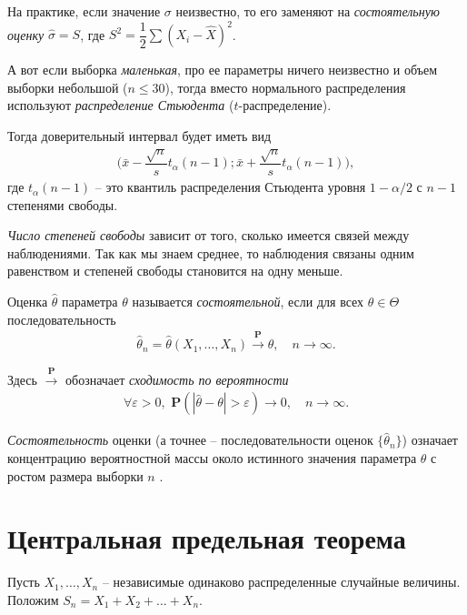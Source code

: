 \documentclass[%
	11pt,
	a4paper,
	utf8,
		]{article}
\begin{document}
На практике, если значение $ \sigma $ неизвестно, то его заменяют на \emph{состоятельную оценку} $ \hat{\sigma} = S $, где $ S^2 = \dfrac{1}{2}\sum (X_i - \hat{X})^2 $.

А вот если выборка \emph{маленькая}, про ее параметры ничего неизвестно и объем выборки небольшой ($ n \leqslant 30 $), тогда вместо нормального распределения используют \emph{распределение Стьюдента} ($ t $-распределение).

Тогда доверительный интервал будет иметь вид
\begin{align*}
	\Big( \bar{x} - \dfrac{\sqrt{n}}{s} t_{\alpha}(n - 1); \bar{x} + \dfrac{\sqrt{n}}{s} t_{\alpha}(n - 1) \Big),
\end{align*}
где $ t_{\alpha}(n-1) $ -- это квантиль распределения Стьюдента уровня $ 1 - \alpha / 2 $ с $ n - 1 $ степенями свободы.


\emph{Число степеней свободы} зависит от того, сколько имеется связей между наблюдениями. Так как мы знаем среднее, то наблюдения связаны одним равенством и степеней свободы становится на одну меньше.

Оценка $ \hat{\theta} $ параметра $ \theta $ называется \emph{состоятельной}, если для всех $ \theta \in \Theta $ последовательность
\begin{align*}
	\hat{\theta}_n = \hat{\theta}(X_1, \dots, X_n) \xrightarrow{\mathbf{P}} \theta, \quad n \to \infty.
\end{align*}

Здесь $ \xrightarrow{\mathbf{P}} $ обозначает \emph{сходимость по вероятности}
\begin{align*}
	\forall \varepsilon > 0, \,\, \mathbf{P}( | \hat{\theta} - \theta | > \varepsilon ) \to 0, \quad n \to \infty.
\end{align*}

\emph{Состоятельность} оценки (а точнее -- последовательности оценок $ \{\hat{\theta}_n\} $) означает концентрацию вероятностной массы около истинного значения параметра $ \theta $ с ростом размера выборки $ n $ \cite[75]{lagutin:2009}.

\section{Центральная предельная теорема}

Пусть $ X_1,\dots, X_n $ -- независимые одинаково распределенные случайные величины. Положим $ S_n = X_1 + X_2 + \dots + X_n $.
\end{document}
